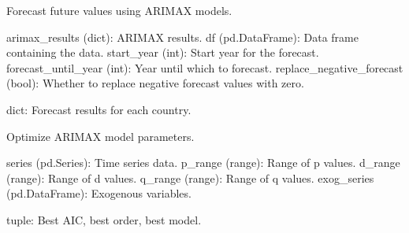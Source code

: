 \documentclass[letterpaper,10pt,english]{sphinxmanual}
\begin{document}
\begin{fulllineitems}
\label{\detokenize{Arimax:Arimax.forecast_future}}
\pysigstartsignatures
{}
\pysigstopsignatures
\sphinxAtStartPar
Forecast future values using ARIMAX models.
\begin{description}
\sphinxAtStartPar
arimax\_results (dict): ARIMAX results.
df (pd.DataFrame): Data frame containing the data.
start\_year (int): Start year for the forecast.
forecast\_until\_year (int): Year until which to forecast.
replace\_negative\_forecast (bool): Whether to replace negative forecast values with zero.

\sphinxAtStartPar
dict: Forecast results for each country.

\end{description}

\end{fulllineitems}


\begin{fulllineitems}
\label{\detokenize{Arimax:Arimax.optimize_arimax}}
\pysigstartsignatures
{}
\pysigstopsignatures
\sphinxAtStartPar
Optimize ARIMAX model parameters.
\begin{description}
\sphinxAtStartPar
series (pd.Series): Time series data.
p\_range (range): Range of p values.
d\_range (range): Range of d values.
q\_range (range): Range of q values.
exog\_series (pd.DataFrame): Exogenous variables.

\sphinxAtStartPar
tuple: Best AIC, best order, best model.

\end{description}

\end{fulllineitems}
\end{document}
